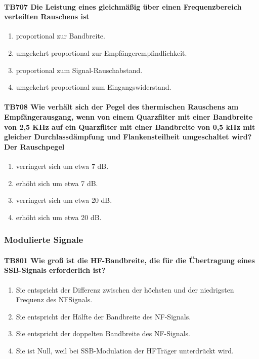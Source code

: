 \documentclass[8pt]{article}
\begin{document}
\begin{enumerate}
\paragraph*{TB707 Die Leistung eines gleichmäßig über einen Frequenzbereich verteilten Rauschens ist}
\begin{enumerate}[nolistsep,label=\Alph*]
\item proportional zur Bandbreite.
\item umgekehrt proportional zur Empfängerempfindlichkeit.
\item proportional zum Signal-Rauschabstand.
\item umgekehrt proportional zum Eingangswiderstand.
\end{enumerate}

\paragraph*{TB708 Wie verhält sich der Pegel des thermischen Rauschens am Empfängerausgang, wenn von einem Quarzfilter mit einer Bandbreite von 2,5 KHz auf ein Quarzfilter mit einer Bandbreite von 0,5 kHz mit gleicher Durchlassdämpfung und Flankensteilheit umgeschaltet wird? Der Rauschpegel}
\begin{enumerate}[nolistsep,label=\Alph*]
\item verringert sich um etwa 7 dB.
\item erhöht sich um etwa 7 dB.
\item verringert sich um etwa 20 dB.
\item erhöht sich um etwa 20 dB.
\end{enumerate}

\pagebreak
\subsubsection{Modulierte Signale}
\paragraph*{TB801 Wie groß ist die HF-Bandbreite, die für die Übertragung eines SSB-Signals erforderlich ist?}
\begin{enumerate}[nolistsep,label=\Alph*]
\item Sie entspricht der Differenz zwischen der höchsten und der niedrigsten Frequenz des NFSignals.
\item Sie entspricht der Hälfte der Bandbreite des NF-Signals.
\item Sie entspricht der doppelten Bandbreite des NF-Signals.
\item Sie ist Null, weil bei SSB-Modulation der HFTräger unterdrückt wird.
\end{enumerate}


\end{enumerate}
\end{document}
